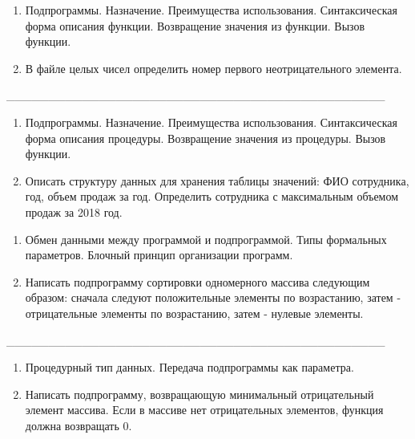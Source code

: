 \documentclass[oneside, final, 14pt]{extreport}
\begin{document}
\newpage


\begin{enumerate}
\item Подпрограммы. Назначение. Преимущества использования.
Синтаксическая форма описания функции. Возвращение значения из функции. Вызов функции.
\item В файле целых чисел определить номер первого неотрицательного элемента.
\end{enumerate}


\_\_\_\_\_\_\_\_\_\_\_\_\_\_\_\_\_\_\_\_\_\_\_\_\_\_\_\_\_\_\_\_\_\_\_\_\_\_\_\_\_\_\_\_\_


\begin{enumerate}
\item Подпрограммы. Назначение. Преимущества использования. Синтаксическая форма описания процедуры. Возвращение значения из процедуры. Вызов функции.
\item Описать структуру данных для хранения таблицы значений: ФИО сотрудника, год, объем продаж за год. Определить сотрудника с максимальным объемом продаж за 2018 год.
\end{enumerate}


\newpage


\begin{enumerate}
\item Обмен данными между программой и подпрограммой. Типы формальных параметров.
Блочный принцип организации программ.
\item Написать подпрограмму сортировки одномерного массива следующим образом: сначала следуют 
 положительные элементы по возрастанию, затем - отрицательные элементы по возрастанию, 
 затем - нулевые элементы.
\end{enumerate}


\_\_\_\_\_\_\_\_\_\_\_\_\_\_\_\_\_\_\_\_\_\_\_\_\_\_\_\_\_\_\_\_\_\_\_\_\_\_\_\_\_\_\_\_\_


\begin{enumerate}
\item Процедурный тип данных. Передача подпрограммы как параметра.
\item Написать подпрограмму, возвращающую минимальный отрицательный элемент массива. Если 
в массиве нет отрицательных элементов, функция должна возвращать 0.
\end{enumerate}


\newpage
\end{document}
